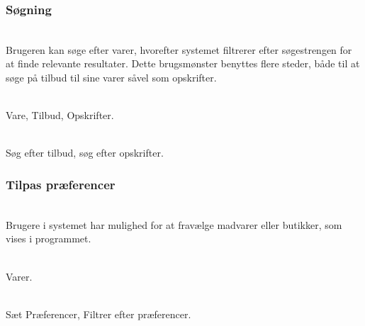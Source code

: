\subsubsection{Søgning}
\vspace{-6pt}
\begin{description}[font=\normalfont\itshape]
\item[Brugsmønster]\hfill\\
Brugeren kan søge efter varer, hvorefter systemet filtrerer efter søgestrengen for at finde relevante resultater.
Dette brugsmønster benyttes flere steder, både til at søge på tilbud til sine varer såvel som opskrifter.
\item[Objekter]\hfill\\
Vare, Tilbud, Opskrifter.
\item[Funktioner]\hfill\\
Søg efter tilbud, søg efter opskrifter.
\end{description}

\subsubsection{Tilpas præferencer}
\vspace{-6pt}
\begin{description}[font=\normalfont\itshape]
\item[Brugsmønster]\hfill\\
Brugere i systemet har mulighed for at fravælge madvarer eller butikker, som vises i programmet.
\item[Objekter]\hfill\\
Varer.
\item[Funktioner]\hfill\\
Sæt Præferencer, Filtrer efter præferencer.
\end{description}

